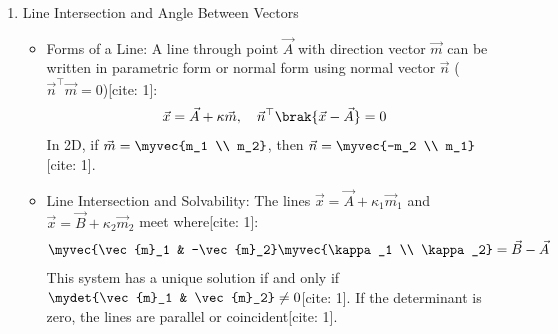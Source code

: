 \begin{enumerate}[label=\thesubsection.\arabic*, ref=\thesubsection.\theenumi,itemsep=0pt]
\begin{itemize}
\item Pencil of Conics:
The intersection of two conics with parameters $\brak{\vec{V}_1, \vec{u}_1, f_1}$ and $\brak{\vec{V}_2, \vec{u}_2, f_2}$ lies on every member of the pencil[cite: 1]:
\begin{align}
\vec{x}^\top \brak{\vec{V}_1 + \mu \vec{V}_2}\vec{x} + 2\brak{\vec{u}_1 + \mu \vec{u}_2}^\top \vec{x} + \brak{f_1 + \mu f_2} = 0
\end{align}

\item Degenerate Conic and Common Chord:
The pencil represents a pair of straight lines (a degenerate conic) if and only if[cite: 1]:
\begin{align}
\mydet{\vec{V}_1 + \mu \vec{V}_2 & \vec{u}_1 + \mu \vec{u}_2 \\ \brak{\vec{u}_1 + \mu \vec{u}_2}^\top & f_1 + \mu f_2} = 0
\end{align}
If $\vec{V}_1 = \vec{V}_2$ (e.g., two circles), choosing $\mu = -1$ removes the second-degree terms, leaving the common chord (radical axis)[cite: 1]:
\begin{align}
2\brak{\vec{u}_1 - \vec{u}_2}^\top \vec{x} + \brak{f_1 - f_2} = 0
\end{align}
\end{itemize}

\item Line Intersection and Angle Between Vectors
\begin{itemize}
\item Forms of a Line:
A line through point $\vec{A}$ with direction vector $\vec{m}$ can be written in parametric form or normal form using normal vector $\vec{n}$ ($\vec{n}^\top \vec{m} = 0$)[cite: 1]:
\begin{align}
\vec{x} = \vec{A} + \kappa \vec{m}, \quad \vec{n}^\top \brak{\vec{x} - \vec{A}} = 0
\end{align}
In 2D, if $\vec{m} = \myvec{m_1 \\ m_2}$, then $\vec{n} = \myvec{-m_2 \\ m_1}$[cite: 1].

\item Line Intersection and Solvability:
The lines $\vec{x} = \vec{A} + \kappa_1 \vec{m}_1$ and $\vec{x} = \vec{B} + \kappa_2 \vec{m}_2$ meet where[cite: 1]:
\begin{align}
\myvec{\vec{m}_1 & -\vec{m}_2} \myvec{\kappa_1 \\ \kappa_2} = \vec{B} - \vec{A}
\end{align}
This system has a unique solution if and only if $\mydet{\vec{m}_1 & \vec{m}_2} \ne 0$[cite: 1]. If the determinant is zero, the lines are parallel or coincident[cite: 1].


\end{itemize}
\end{enumerate}
